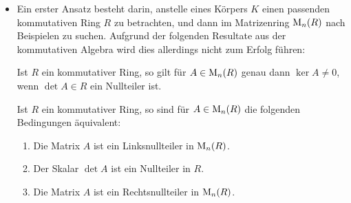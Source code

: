 \begin{itemize}
  \item
    Ein erster Ansatz besteht darin, anstelle eines Körpers $K$ einen passenden kommutativen Ring $R$ zu betrachten, und dann im Matrizenring $\operatorname{M}_{n}(R)$ nach Beispielen zu suchen.
    Aufgrund der folgenden Resultate aus der kommutativen Algebra wird dies allerdings nicht zum Erfolg führen:
    
    \begin{lemma}
      Ist $R$ ein kommutativer Ring, so gilt für $A \in \operatorname{M}_{n}(R)$ genau dann $\ker A \neq 0$, wenn $\det A \in R$ ein Nullteiler ist.
    \end{lemma}

    \begin{corollary}
      Ist $R$ ein kommutativer Ring, so sind für $A \in \operatorname{M}_{n}(R)$ die folgenden Bedingungen äquivalent:
      \begin{enumerate}[leftmargin=*, label=\roman*)]
        \item
          Die Matrix $A$ ist ein Linksnullteiler in $\operatorname{M}_{n}(R)$.
        \item
          Der Skalar $\det A$ ist ein Nullteiler in $R$.
        \item
          Die Matrix $A$ ist ein Rechtsnullteiler in $\operatorname{M}_{n}(R)$.
      \end{enumerate}
    \end{corollary}
  

\end{itemize}
